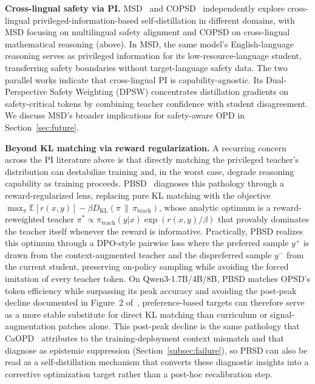\documentclass{article} %
\newcommand{\E}{\mathbb{E}}
\begin{document}
\textbf{Cross-lingual safety via PI.} MSD~\citep{2605.02971} and COPSD~\citep{2605.09548} independently explore cross-lingual privileged-information-based self-distillation in different domains, with MSD focusing on multilingual safety alignment and COPSD on cross-lingual mathematical reasoning (above). In MSD, the same model's English-language reasoning serves as privileged information for its low-resource-language student, transferring safety boundaries without target-language safety data. The two parallel works indicate that cross-lingual PI is capability-agnostic. Its Dual-Perspective Safety Weighting (DPSW) concentrates distillation gradients on safety-critical tokens by combining teacher confidence with student disagreement. We discuss MSD's broader implications for safety-aware OPD in Section~\ref{sec:future}.

\textbf{Beyond KL matching via reward regularization.} A recurring concern across the PI literature above is that directly matching the privileged teacher's distribution can destabilize training and, in the worst case, degrade reasoning capability as training proceeds. PBSD~\citep{2605.05040} diagnoses this pathology through a reward-regularized lens, replacing pure KL matching with the objective $\max_{\pi} \E[r(x,y)] - \beta D_{\mathrm{KL}}(\pi \,\|\, \pi_{\text{teach}})$, whose analytic optimum is a reward-reweighted teacher $\pi^* \propto \pi_{\text{teach}}(y|x) \exp(r(x,y)/\beta)$ that provably dominates the teacher itself whenever the reward is informative. Practically, PBSD realizes this optimum through a DPO-style pairwise loss where the preferred sample $y^+$ is drawn from the context-augmented teacher and the dispreferred sample $y^-$ from the current student, preserving on-policy sampling while avoiding the forced imitation of every teacher token. On Qwen3-1.7B/4B/8B, PBSD matches OPSD's token efficiency while surpassing its peak accuracy and avoiding the post-peak decline documented in Figure~2 of~\citet{2605.05040}, preference-based targets can therefore serve as a more stable substitute for direct KL matching than curriculum or signal-augmentation patches alone. This post-peak decline is the same pathology that CaOPD~\citep{2604.16830} attributes to the training-deployment context mismatch and that~\citet{2603.24472} diagnose as epistemic suppression (Section~\ref{subsec:failure}), so PBSD can also be read as a self-distillation mechanism that converts these diagnostic insights into a corrective optimization target rather than a post-hoc recalibration step.
\end{document}
